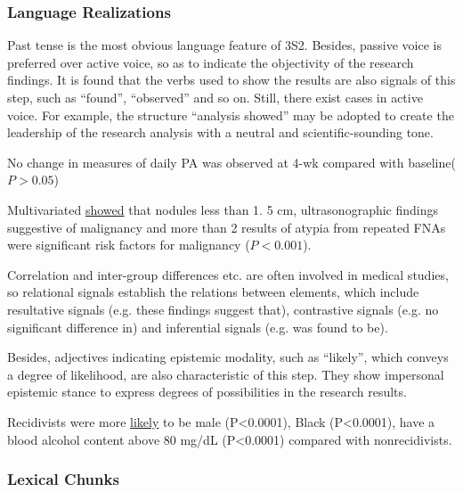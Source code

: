 \documentclass{ctexbook}
\begin{document}
    \subsubsection{Language Realizations}

    Past tense is the most obvious language feature of 3S2. Besides, passive voice is preferred over active voice, so as to indicate the objectivity of the research findings. It is found that the verbs used to show the results are also signals of this step, such as ``found'', ``observed'' and so on. Still, there exist cases in active voice. For example, the structure ``analysis showed'' may be adopted to create the leadership of the research analysis with a neutral and scientific-sounding tone.

    \begin{eg}{}
      No change in measures of daily PA was observed at 4-wk compared with baseline($P>0.05$)   
    \end{eg}

    \begin{eg}{}
      Multivariated  \uline{showed} that nodules less than 1. 5 cm, ultrasonographic findings suggestive of malignancy and more than 2 results of atypia from repeated FNAs were significant risk factors for malignancy ($P<0.001$).  
    \end{eg}

    Correlation and inter-group differences etc. are often involved in medical studies, so relational signals establish the relations between elements, which include resultative signals (e.g. these findings suggest that), contrastive signals (e.g. no significant difference in) and inferential signals (e.g. was found to be).

    Besides, adjectives indicating epistemic modality, such as ``likely'', which conveys a degree of likelihood, are also characteristic of this step. They show impersonal epistemic stance to express degrees of possibilities in the research results.

    \begin{eg}{}
      Recidivists were more \uline{likely} to be male (P<0.0001), Black (P<0.0001), have a blood alcohol content above 80 mg/dL (P<0.0001) compared with nonrecidivists.  
    \end{eg}

    \subsubsection{Lexical Chunks}
\end{document}
